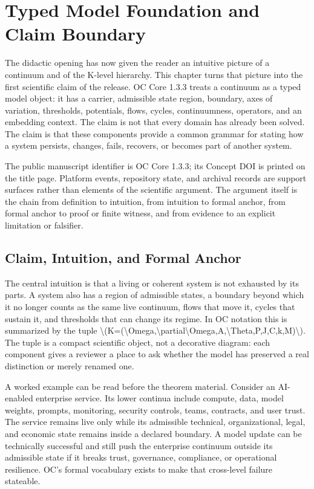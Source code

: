\section{Typed Model Foundation and Claim Boundary}
\label{sec:oc133-integrated-scientific-closure}
The didactic opening has now given the reader an intuitive picture of a continuum and of the K-level hierarchy. This chapter turns that picture into the first scientific claim of the release. OC Core 1.3.3 treats a continuum as a typed model object: it has a carrier, admissible state region, boundary, axes of variation, thresholds, potentials, flows, cycles, continuumness, operators, and an embedding context. The claim is not that every domain has already been solved. The claim is that these components provide a common grammar for stating how a system persists, changes, fails, recovers, or becomes part of another system.

The public manuscript identifier is OC Core 1.3.3; its Concept DOI is printed on the title page. Platform events, repository state, and archival records are support surfaces rather than elements of the scientific argument. The argument itself is the chain from definition to intuition, from intuition to formal anchor, from formal anchor to proof or finite witness, and from evidence to an explicit limitation or falsifier.

\subsection{Claim, Intuition, and Formal Anchor}
The central intuition is that a living or coherent system is not exhausted by its parts. A system also has a region of admissible states, a boundary beyond which it no longer counts as the same live continuum, flows that move it, cycles that sustain it, and thresholds that can change its regime. In OC notation this is summarized by the tuple \textbackslash{}(K=(\textbackslash{}Omega,\textbackslash{}partial\textbackslash{}Omega,A,\textbackslash{}Theta,P,J,C,k,M)\textbackslash{}). The tuple is a compact scientific object, not a decorative diagram: each component gives a reviewer a place to ask whether the model has preserved a real distinction or merely renamed one.

A worked example can be read before the theorem material. Consider an AI-enabled enterprise service. Its lower continua include compute, data, model weights, prompts, monitoring, security controls, teams, contracts, and user trust. The service remains live only while its admissible technical, organizational, legal, and economic state remains inside a declared boundary. A model update can be technically successful and still push the enterprise continuum outside its admissible state if it breaks trust, governance, compliance, or operational resilience. OC's formal vocabulary exists to make that cross-level failure stateable.

